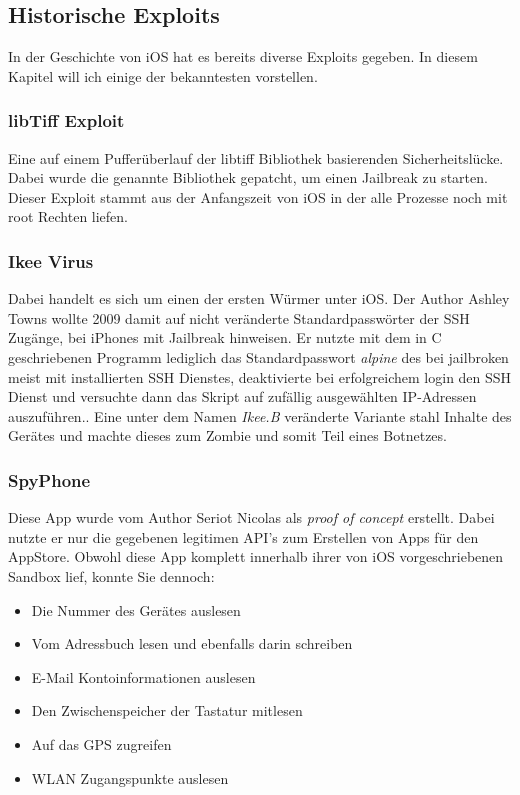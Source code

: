 	\subsection{Historische Exploits}
		In der Geschichte von iOS hat es bereits diverse Exploits\cite{Exploit2015}
		gegeben. In diesem Kapitel will ich einige der bekanntesten vorstellen.
		\subsubsection{libTiff Exploit} 
			Eine auf einem Pufferüberlauf der libtiff Bibliothek basierenden
			Sicherheitslücke. Dabei wurde die genannte Bibliothek gepatcht, um einen
			Jailbreak zu starten\cite{LibTiffExploit2015}. Dieser Exploit
			stammt aus der Anfangszeit von iOS in der alle Prozesse noch mit root
			Rechten liefen.
		\subsubsection{Ikee Virus}\label{sec:ikee-exploit}
			Dabei handelt es sich um einen der ersten Würmer unter iOS. Der	Author Ashley Towns
			wollte 2009 damit auf nicht veränderte Standardpasswörter der SSH Zugänge,
			bei iPhones mit Jailbreak hinweisen. Er nutzte mit dem in C geschriebenen
			Programm lediglich das Standardpasswort \textsl{alpine} des bei jailbroken
			meist mit installierten SSH Dienstes, deaktivierte bei erfolgreichem login
			den SSH Dienst und versuchte dann das Skript auf zufällig ausgewählten
			IP-Adressen auszuführen.\cite{IkeeExploit2009}. Eine unter dem Namen
			\textsl{Ikee.B} veränderte Variante stahl Inhalte des Gerätes und machte
			dieses zum Zombie und somit Teil eines Botnetzes.
		\subsubsection{SpyPhone}
			Diese App wurde vom Author Seriot Nicolas als
			\textsl{proof of concept} erstellt. Dabei nutzte er nur die gegebenen
			legitimen API's zum Erstellen von Apps für den AppStore. Obwohl diese App
			komplett innerhalb ihrer von iOS vorgeschriebenen Sandbox lief, konnte
			Sie dennoch:
			\begin{itemize}\itemsep0pt
				\item{Die Nummer des Gerätes auslesen}
				\item{Vom Adressbuch lesen und ebenfalls darin schreiben}
				\item{E-Mail Kontoinformationen auslesen}
				\item{Den Zwischenspeicher der Tastatur mitlesen}
				\item{Auf das GPS zugreifen}
				\item{WLAN Zugangspunkte auslesen}
			\end{itemize}
			
